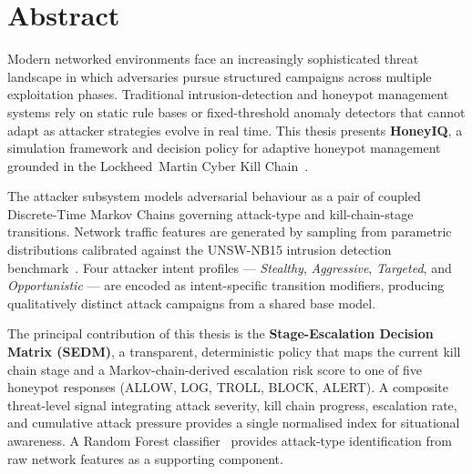 \chapter*{Abstract}

Modern networked environments face an increasingly sophisticated threat landscape
in which adversaries pursue structured campaigns across multiple exploitation
phases.
Traditional intrusion-detection and honeypot management systems rely on static
rule bases or fixed-threshold anomaly detectors that cannot adapt as attacker
strategies evolve in real time.
This thesis presents \textbf{HoneyIQ}, a simulation framework and decision
policy for adaptive honeypot management grounded in the Lockheed~Martin
Cyber Kill Chain~\citep{hutchins2011intelligence}.

The attacker subsystem models adversarial behaviour as a pair of coupled
Discrete-Time Markov Chains governing attack-type and kill-chain-stage
transitions.
Network traffic features are generated by sampling from parametric
distributions calibrated against the UNSW-NB15 intrusion detection
benchmark~\citep{moustafa2015unsw}.
Four attacker intent profiles --- \emph{Stealthy}, \emph{Aggressive},
\emph{Targeted}, and \emph{Opportunistic} --- are encoded as intent-specific
transition modifiers, producing qualitatively distinct attack campaigns from
a shared base model.

The principal contribution of this thesis is the
\textbf{Stage-Escalation Decision Matrix (SEDM)}, a transparent, deterministic
policy that maps the current kill chain stage and a Markov-chain-derived
escalation risk score to one of five honeypot responses
(ALLOW, LOG, TROLL, BLOCK, ALERT).
A composite threat-level signal integrating attack severity, kill chain
progress, escalation rate, and cumulative attack pressure provides a
single normalised index for situational awareness.
A Random Forest classifier~\citep{breiman2001random} provides attack-type
identification from raw network features as a supporting component.

